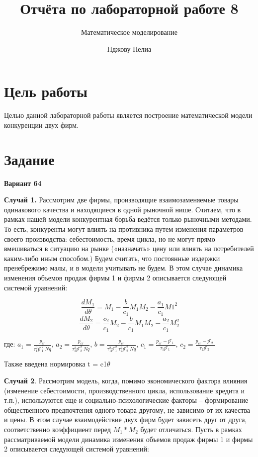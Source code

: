 \documentclass[
  12pt,
  a4paper,
  DIV=11,
  numbers=noendperiod]{scrreprt}
\title{Отчёта по лабораторной работе 8}
\subtitle{Математическое моделирование}
\author{Нджову Нелиа}
\date{}
\renewcommand*\contentsname{Содержание}
\newcommand\contentsname{Содержание}
\begin{document}
\maketitle

\renewcommand*\contentsname{Содержание}
{
\setcounter{tocdepth}{1}
\tableofcontents
}
\listoffigures
\listoftables
{}
\chapter{Цель
работы}\label{ux446ux435ux43bux44c-ux440ux430ux431ux43eux442ux44b}

Целью данной лабораторной работы является построение математической
модели конкуренции двух фирм.

\chapter{Задание}\label{ux437ux430ux434ux430ux43dux438ux435}

\textbf{Вариант 64}

\textbf{Случай 1.} Рассмотрим две фирмы, производящие взаимозаменяемые
товары одинакового качества и находящиеся в одной рыночной нише.
Считаем, что в рамках нашей модели конкурентная борьба ведётся только
рыночными методами. То есть, конкуренты могут влиять на противника путем
изменения параметров своего производства: себестоимость, время цикла, но
не могут прямо вмешиваться в ситуацию на рынке («назначать» цену или
влиять на потребителей каким-либо иным способом.) Будем считать, что
постоянные издержки пренебрежимо малы, и в модели учитывать не будем. В
этом случае динамика изменения объемов продаж фирмы 1 и фирмы 2
описывается следующей системой уравнений:

\[
\frac{dM_1}{d\theta} = M_1 - \frac{b}{c_1}M_1M_2 - \frac{a_1}{c_1}M1^2
\] \[
\frac{dM_2}{d\theta} = \frac{c_2}{c_1}M_2 - \frac{b}{c_1}M_1M_2 - \frac{a_2}{c_1}M_2^2
\]

где: \(a_1 = \frac{p_{cr}}{\tau_1^2p̃_1^2Nq}\),
\(a_2 = \frac{p_{cr}}{\tau_2^2p̃_2^2Nq}\),
\(b = \frac{p_{cr}}{\tau_1^2p̃_1^2\tau_2^2p̃_2^2Nq}\),
\(c_1 = \frac{p_{cr} - p̃_1}{\tau_1p̃_1}\),
\(c_2 = \frac{p_{cr} - p̃_2}{\tau_2p̃_2}\)

Также введена нормировка t = c1\(\theta\)

\textbf{Случай 2}. Рассмотрим модель, когда, помимо экономического
фактора влияния (изменение себестоимости, производственного цикла,
использование кредита и т.п.), используются еще и
социально-психологические факторы -- формирование общественного
предпочтения одного товара другому, не зависимо от их качества и цены. В
этом случае взаимодействие двух фирм будет зависеть друг от друга,
соответственно коэффициент перед \(M_1*M_2\) будет отличаться. Пусть в
рамках рассматриваемой модели динамика изменения объемов продаж фирмы 1
и фирмы 2 описывается следующей системой уравнений:
\end{document}
